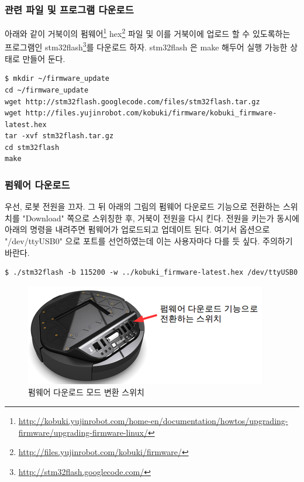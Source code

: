 \subsubsection{관련 파일 및 프로그램 다운로드}

아래와 같이 거북이의 펌웨어\footnote{\url{http://kobuki.yujinrobot.com/home-en/documentation/howtos/upgrading-firmware/upgrading-firmware-linux/}} hex\footnote{\url{http://files.yujinrobot.com/kobuki/firmware/}} 파일 및 이를 거북이에 업로드 할 수 있도록하는 프로그램인 stm32flash\footnote{\url{http://stm32flash.googlecode.com/}}를 다운로드 하자. stm32flash 은 make 해두어 실행 가능한 상태로 만들어 둔다. 

\vspace{\baselineskip}
\begin{lstlisting}[language=ROS]
$ mkdir ~/firmware_update
cd ~/firmware_update
wget http://stm32flash.googlecode.com/files/stm32flash.tar.gz
wget http://files.yujinrobot.com/kobuki/firmware/kobuki_firmware-latest.hex
tar -xvf stm32flash.tar.gz
cd stm32flash
make
\end{lstlisting}


\subsubsection{펌웨어 다운로드}

우선, 로봇 전원을 끄자. 그 뒤 아래의 그림의 펌웨어 다운로드 기능으로 전환하는 스위치를 "Download" 쪽으로 스위칭한 후, 거북이 전원을 다시 킨다. 전원을 키는가 동시에 아래의 명령을 내려주면 펌웨어가 업로드되고 업데이트 된다. 여기서 옵션으로 "/dev/ttyUSB0" 으로 포트를 선언하였는데 이는 사용자마다 다를 듯 싶다. 주의하기 바란다.

\vspace{\baselineskip}
\begin{lstlisting}[language=ROS]
$ ./stm32flash -b 115200 -w ../kobuki_firmware-latest.hex /dev/ttyUSB0
\end{lstlisting}

\begin{figure}[h]
\centering\includegraphics[width=0.4\columnwidth]{pictures/chapter10/firmware_download.png}
\caption{펌웨어 다운로드 모드 변환 스위치}
\end{figure}

